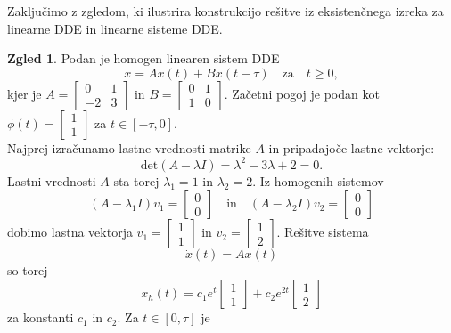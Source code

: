 \documentclass[12pt,a4paper]{amsart}
\theoremstyle{definition} %
\newtheorem{zgled}[definicija]{Zgled}
\theoremstyle{plain} %
\begin{document}
Zaključimo z zgledom, ki ilustrira konstrukcijo rešitve iz eksistenčnega izreka za linearne DDE in linearne sisteme DDE.
\begin{zgled}
    Podan je homogen linearen sistem DDE
    \[\dot{x}=Ax(t)+Bx(t-\tau)\quad \text{za}\quad t\geq0,\]
    kjer je $A=
    \begin{bmatrix}
        0 & 1 \\
        -2 & 3 
    \end{bmatrix}$
    in $B=
    \begin{bmatrix}
        0 & 1 \\
        1 & 0 
    \end{bmatrix}.$
    Začetni pogoj je podan kot 
    $\phi(t)=\begin{bmatrix}
        1 \\
        1 
    \end{bmatrix}$
    za $t\in[-\tau,0]$. \\
    Najprej izračunamo lastne vrednosti matrike $A$ in pripadajoče lastne vektorje:
    \[\text{det}(A-\lambda I)=\lambda^2-3\lambda+2=0.\]
    Lastni vrednosti $A$ sta torej $\lambda_1=1$ in $\lambda_2=2$.
    Iz homogenih sistemov
    \[(A-\lambda_1 I)v_1=\begin{bmatrix}
        0 \\
        0 
    \end{bmatrix}
    \quad \text{in} \quad
    (A-\lambda_2 I)v_2=\begin{bmatrix}
        0 \\
        0 
    \end{bmatrix}\]
    dobimo lastna vektorja $v_1=\begin{bmatrix}
        1 \\
        1 
    \end{bmatrix}$
    in  $v_2=\begin{bmatrix}
        1 \\
        2 
    \end{bmatrix}$.
    Rešitve sistema 
    \[\dot{x}(t)=Ax(t)\]
    so torej 
    \[x_h(t)=c_1e^t\begin{bmatrix}
        1 \\
        1 
    \end{bmatrix}
    +c_2e^{2t}\begin{bmatrix}
        1 \\
        2 
    \end{bmatrix}\]
    za konstanti $c_1$ in $c_2$. 
    Za $t\in[0,\tau]$ je
    \begin{equation*}

\end{equation*}
\end{zgled}
\end{document}
